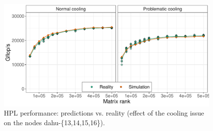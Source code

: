        \begin{figure}[htpb]
            \begin{minipage}{0.8\linewidth}
                \centering
                \includegraphics[width=\linewidth]{img/prediction/validation/temperature/validation_temperature.pdf}
            \end{minipage}%
            \begin{minipage}{0.2\linewidth}
            \end{minipage}
            \caption{HPL performance: predictions vs. reality (effect of the cooling issue on the nodes dahu-\{13,14,15,16\}).}
            \label{fig:validation_temperature}
        \end{figure}

